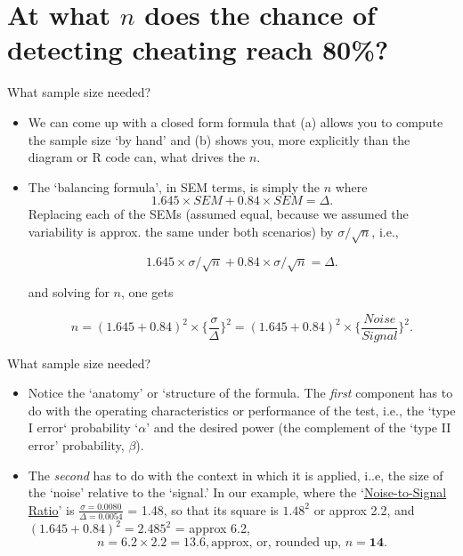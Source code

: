 \documentclass{beamer}\usepackage[]{graphicx}\usepackage[]{color}
\begin{document}
\section{At what $n$ does the chance of detecting cheating reach 80\%?}

\begin{frame}{What sample size needed?}

\begin{itemize}
	\item We can come up with a closed form formula that (a) allows you to compute the sample size `by hand' and (b) shows you, more explicitly than the diagram or R code can, what drives the $n$.

\item The `balancing formula', in SEM terms, is simply the $n$ where
$$ 1.645 \times SEM + 0.84 \times SEM = \Delta.$$
Replacing each of the  SEMs (assumed equal, because we assumed the variability
is approx. the same under both scenarios) by $\sigma/\sqrt{n}$,  i.e.,

$$ 1.645 \times \sigma/\sqrt{n} + 0.84 \times \sigma/\sqrt{n} = \Delta.$$

and solving for $n$, one gets

$$  n = (1.645 + 0.84)^2  \times \bigg\{ \frac{\sigma}{\Delta} \bigg\}^2 = 
(1.645 + 0.84)^2  \times \bigg\{ \frac{Noise}{Signal} \bigg\}^2 .$$
\end{itemize}

\end{frame}

\begin{frame}{What sample size needed?}
\begin{itemize}
	\item Notice the `anatomy' or `structure of the formula. The \textit{first} component has to do
	with the operating characteristics or performance of the test, i.e.,
	the `type I error` probability `$\alpha$' 
	and the desired power (the complement of the `type II error' probability, $\beta$).
	
	\item The \textit{second} has to do
	with the context in which it is applied, i..e, the size of the `noise' relative to the  `signal.'
	In our example, where the `\underline{Noise-to-Signal Ratio}' is $\frac{\sigma = 0.0080}{\Delta = 0.0054}$ = 1.48,
	so that its square is $1.48^2$ or approx 2.2,
	and $(1.645 + 0.84)^2 = 2.485^2$ = approx 6.2,
	$$  n = 6.2  \times 2.2  =  13.6, \textrm{approx, or, rounded up,  } n = \textbf{14}. $$
\end{itemize}
\end{frame}
\end{document}
